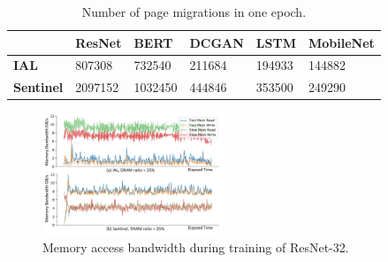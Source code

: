 \begin{table}[]
\begin{spacing}{0.9}
\small
\vspace{-10pt}
\caption{Number of page migrations in one epoch. %
}
\vspace{-6pt}
\begin{tabular}{|p{1.05cm}|p{1cm}|p{0.9cm}|p{1cm}|p{0.9cm}|p{1.1cm}|}
\hline
   & ResNet & BERT & DCGAN & LSTM & MobileNet \\ \hline
\textbf{IAL}  & 807308	& 732540 &	211684	&194933  & 144882 \\ \hline
\textbf{Sentinel} & 2097152	& 1032450	& 444846 &	353500  & 249290 \\ \hline
\end{tabular}
\vspace{-2pt}
\label{tab:migration}
\end{spacing}
\end{table}
\begin{figure}
\centering
\includegraphics[width=0.48\textwidth,height=0.65\linewidth]{figures/bandwidth.pdf}
\vspace{-25pt}
\caption{\textcolor{check}{Memory access bandwidth during training of ResNet-32}.}
\vspace{-6pt}
\label{fig:bandwidth_consumption}
\end{figure}

